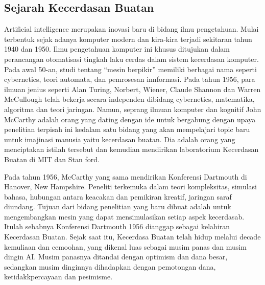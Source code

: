 \subsection{Sejarah Kecerdasan Buatan}
    Artificial intelligence merupakan inovasi baru di bidang ilmu pengetahuan. Mulai terbentuk sejak adanya komputer modern dan kira-kira terjadi sekitaran tahun 1940 dan 1950. Ilmu pengetahuan komputer ini khusus ditujukan dalam perancangan otomatisasi tingkah laku cerdas dalam sistem kecerdasan komputer. Pada awal 50-an, studi tentang “mesin berpikir” memiliki berbagai nama seperti cybernetics, teori automata, dan pemrosesan innformasi. Pada tahun 1956, para ilmuan jenius seperti Alan Turing, Norbert, Wiener, Claude Shannon dan Warren McCullough telah bekerja secara independen dibidang cybernetics, matematika, algoritma dan teori jaringan. Namun, seprang ilmuan komputer dan kognitif John McCarthy adalah orang yang dating dengan ide untuk bergabung dengan upaya penelitian terpisah ini kedalam satu bidang yang akan mempelajari topic baru untuk imajinasi manusia yaitu kecerdasan buatan. Dia adalah orang yang menciptakan istilah tersebut dan kemudian mendirikan laboratorium Kecerdasan Buatan di MIT dan Stan ford.

    Pada tahun 1956, McCarthy yang sama mendirikan Konferensi Dartmouth di Hanover, New Hampshire. Peneliti terkemuka dalam teori kompleksitas, simulasi bahasa, hubungan antara keacakan dan pemikiran kreatif, jaringan saraf diundang. Tujuan dari bidang penelitian yang baru dibuat adalah untuk mengembangkan mesin yang dapat mensimulasikan setiap aspek kecerdasab. Itulah sebabnya Konferensi Dartmouth 1956 dianggap sebagai kelahiran Kecerdasan Buatan. Sejak saat itu, Kecerdasa Buatan telah hidup melalui decade kemuliaan dan cemoohan, yang dikenal luas sebagai musim panas dan musim dingin AI. Musim panasnya ditandai dengan optimism dan dana besar, sedangkan musim dinginnya dihadapkan dengan pemotongan dana, ketidakkpercayaan dan pesimisme.

